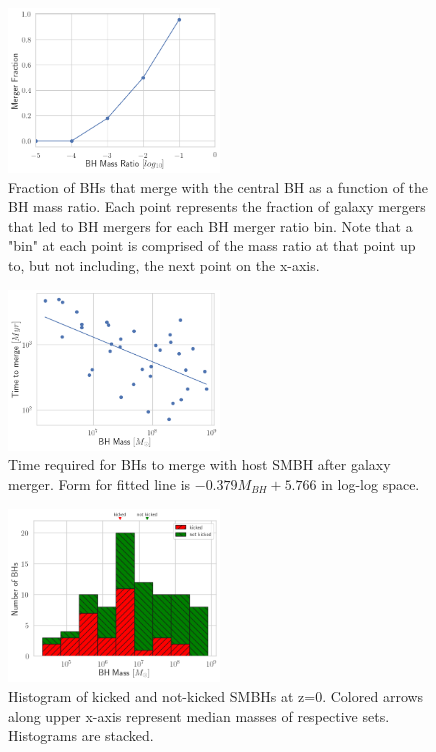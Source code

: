 \documentclass[fleqn,usenatbib,useAMS]{mnras}
\begin{document}
\begin{figure}
\begin{center}
\includegraphics[width=0.5\textwidth]{plots/q_merger_fraction.png}
\caption{Fraction of BHs that merge with the central BH as a function of the BH mass ratio.  Each point represents the fraction of galaxy mergers that led to BH mergers for each BH merger ratio bin.  Note that a "bin" at each point is comprised of the mass ratio at that point up to, but not including, the next point on the x-axis.}
\label{fig:q_merge_fraction}
\end{center}
\end{figure}

\begin{figure}
\begin{center}
\includegraphics[width=0.5\textwidth]{plots/time_to_merge.png}
\caption{Time required for BHs to merge with host SMBH after galaxy merger.  Form for fitted line is $-0.379M_{BH}+5.766$ in log-log space.}
\label{fig:time_to_merge}
\end{center}
\end{figure}

\begin{figure}
\begin{center}
\includegraphics[width=0.5\textwidth]{plots/kicked_stats.png}
\caption{Histogram of kicked and not-kicked SMBHs at z=0.  Colored arrows along upper x-axis represent median masses of respective sets.  Histograms are stacked.}
\label{fig:kicked_stats}
\end{center}
\end{figure}
\end{document}
